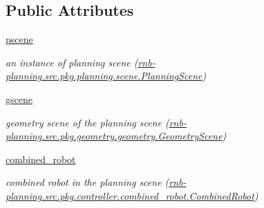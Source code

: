 \subsection*{Public Attributes}
\begin{DoxyCompactItemize}
\item 
\mbox{\label{classrnb-planning_1_1src_1_1pkg_1_1planning_1_1motion_1_1interface_1_1_motion_interface_a00c505ee267290c0439334e007b216bd}} 
\hyperlink{classrnb-planning_1_1src_1_1pkg_1_1planning_1_1motion_1_1interface_1_1_motion_interface_a00c505ee267290c0439334e007b216bd}{pscene}
\begin{DoxyCompactList}\small\item\em an instance of planning scene (\hyperlink{classrnb-planning_1_1src_1_1pkg_1_1planning_1_1scene_1_1_planning_scene}{rnb-\/planning.\+src.\+pkg.\+planning.\+scene.\+Planning\+Scene}) \end{DoxyCompactList}\item 
\mbox{\label{classrnb-planning_1_1src_1_1pkg_1_1planning_1_1motion_1_1interface_1_1_motion_interface_abca6feb76cacceed72758b60f709a9e0}} 
\hyperlink{classrnb-planning_1_1src_1_1pkg_1_1planning_1_1motion_1_1interface_1_1_motion_interface_abca6feb76cacceed72758b60f709a9e0}{gscene}
\begin{DoxyCompactList}\small\item\em geometry scene of the planning scene (\hyperlink{classrnb-planning_1_1src_1_1pkg_1_1geometry_1_1geometry_1_1_geometry_scene}{rnb-\/planning.\+src.\+pkg.\+geometry.\+geometry.\+Geometry\+Scene}) \end{DoxyCompactList}\item 
\mbox{\label{classrnb-planning_1_1src_1_1pkg_1_1planning_1_1motion_1_1interface_1_1_motion_interface_ab47e4f104149ba0cef88149f569f2218}} 
\hyperlink{classrnb-planning_1_1src_1_1pkg_1_1planning_1_1motion_1_1interface_1_1_motion_interface_ab47e4f104149ba0cef88149f569f2218}{combined\+\_\+robot}
\begin{DoxyCompactList}\small\item\em combined robot in the planning scene (\hyperlink{classrnb-planning_1_1src_1_1pkg_1_1controller_1_1combined__robot_1_1_combined_robot}{rnb-\/planning.\+src.\+pkg.\+controller.\+combined\+\_\+robot.\+Combined\+Robot}) \end{DoxyCompactList}\item 

\end{DoxyCompactItemize}
